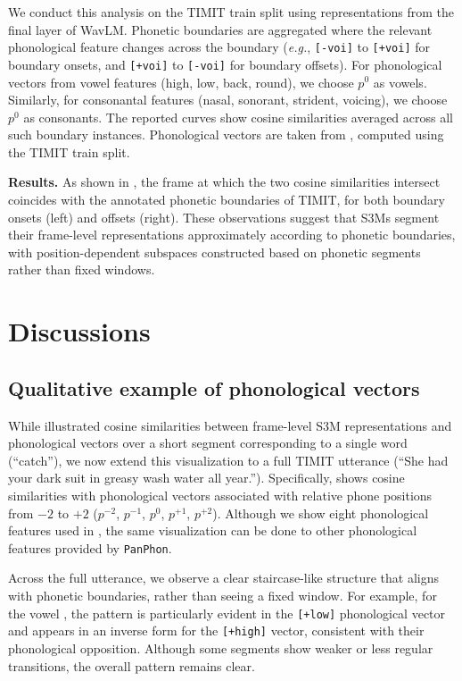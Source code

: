 \documentclass[cameraready]{Interspeech}
\begin{document}
We conduct this analysis on the TIMIT train split using representations from the final layer of WavLM.
Phonetic boundaries are aggregated where the relevant phonological feature changes across the boundary (\textit{e.g.}, \texttt{[-voi]} to \texttt{[+voi]} for boundary onsets, and \texttt{[+voi]} to \texttt{[-voi]} for boundary offsets).
For phonological vectors from vowel features (high, low, back, round), we choose $p^0$ as vowels.
Similarly, for consonantal features (nasal, sonorant, strident, voicing), we choose $p^0$ as consonants.
The reported curves show cosine similarities averaged across all such boundary instances.
Phonological vectors are taken from , computed using the TIMIT train split.

\textbf{Results.}
As shown in , the frame at which the two cosine similarities intersect coincides with the annotated phonetic boundaries of TIMIT, for both boundary onsets (left) and offsets (right).
These observations suggest that S3Ms segment their frame-level representations approximately according to phonetic boundaries, with position-dependent subspaces constructed based on phonetic segments rather than fixed windows.



\section{Discussions}
\subsection{Qualitative example of phonological vectors}\label{ss:demo}
While  illustrated cosine similarities between frame-level S3M representations and phonological vectors over a short segment corresponding to a single word (``catch''), we now extend this visualization to a full TIMIT utterance (``She had your dark suit in greasy wash water all year.'').
Specifically,  shows cosine similarities with phonological vectors associated with relative phone positions from $-2$ to $+2$ ($p^{-2}$, $p^{-1}$, $p^{0}$, $p^{+1}$, $p^{+2}$).
Although we show eight phonological features used in , the same visualization can be done to other phonological features provided by \texttt{PanPhon}.


Across the full utterance, we observe a clear staircase-like structure that aligns with phonetic boundaries, rather than seeing a fixed window.
For example, for the vowel \textipa{[E]}, the pattern is particularly evident in the \texttt{[+low]} phonological vector and appears in an inverse form for the \texttt{[+high]} vector, consistent with their phonological opposition.
Although some segments show weaker or less regular transitions, the overall pattern remains clear.
\end{document}
